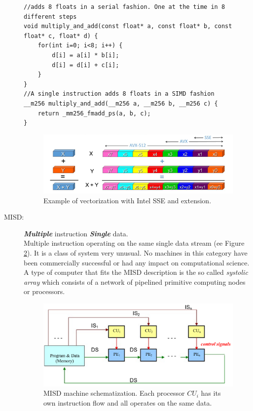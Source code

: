 \begin{description}
{}
\begin{lstlisting}
//adds 8 floats in a serial fashion. One at the time in 8 different steps
void multiply_and_add(const float* a, const float* b, const float* c, float* d) {  
	for(int i=0; i<8; i++) {
		d[i] = a[i] * b[i];
		d[i] = d[i] + c[i];
	}
}
//A single instruction adds 8 floats in a SIMD fashion
__m256 multiply_and_add(__m256 a, __m256 b, __m256 c) {
	return _mm256_fmadd_ps(a, b, c);
}
\end{lstlisting}
\begin{figure}[!htbp]
	\centering
	\includegraphics[width=1.0\textwidth]{./images/parallel_programming/vectorization_example}
	\caption{Example of vectorization with Intel SSE and extension.}
	\label{fig:SSEvectorization}
\end{figure}

\item[MISD:] \textit{\textbf{Multiple}} instruction \textit{\textbf{Single}} data. \hfill \\ 
Multiple instruction operating on the same single data stream  (ee Figure \ref{fig:MISD}). It is a class of system very unusual. No machines in this category have been commercially successful or had any impact on computational science. 
A type of computer  that fits the MISD description is the so called \textit{systolic array} \cite{fortes:1987,kung:1984} which consists of a network of pipelined primitive computing nodes or processors. 
\begin{figure}[!htbp]
	\centering
	\includegraphics[width=1.0\textwidth]{./images/parallel_programming/MISD}
	\caption{MISD machine schematization. Each processor $CU_i$ has its own instruction flow and all operates on the same data.}
	\label{fig:MISD}
\end{figure}
 

\end{description}
